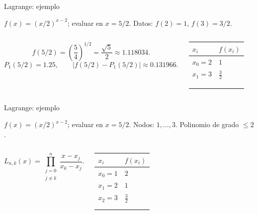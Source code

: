 \documentclass[main.tex]{subfiles}
\begin{document}
\begin{frame}[t]{Lagrange: ejemplo}
\par\noindent\begin{minipage}[t][7.5mm][t]{\textwidth}\small\strut $f(x)=(x/2)^{x-2}$; evaluar en $x=5/2$. Datos: $f(2)=1$, $f(3)=3/2$.\end{minipage}\par\nointerlineskip
\begin{columns}[T]\small\setlength{\abovedisplayskip}{4pt}\setlength{\belowdisplayskip}{4pt}\[f(5/2)=\left(\frac54\right)^{1/2}=\frac{\sqrt5}{2}\approx1.118034.\]\[P_1(5/2)=1.25,\qquad |f(5/2)-P_1(5/2)|\approx0.131966.\]\begingroup\small\setlength{\tabcolsep}{3pt}\begin{center}\begin{tabular}{|C{.42\textwidth}|C{.42\textwidth}|}\hline
\rule[-2mm]{0pt}{6mm}$x_i$&$f(x_i)$\\\hline
\rule[-2.5mm]{0pt}{6mm}$x_0=2$&$1$\\\hline
\rule[-2.5mm]{0pt}{6mm}$x_1=3$&$\frac{3}{2}$\\\hline
\rule[-2.5mm]{0pt}{6mm}&\\\hline
\rule[-2.5mm]{0pt}{6mm}&\\\hline
\rule[-2.5mm]{0pt}{6mm}&\\\hline
\end{tabular}\end{center}\endgroup\par
\end{columns}
\end{frame}
\begin{frame}[t]{Lagrange: ejemplo}
\par\noindent\begin{minipage}[t][7.5mm][t]{\textwidth}\small\strut $f(x)=(x/2)^{x-2}$; evaluar en $x=5/2$. Nodos: $1,\ldots,3$. Polinomio de grado $\le 2$.\end{minipage}\par\nointerlineskip
\begin{columns}[T]\small\setlength{\abovedisplayskip}{4pt}\setlength{\belowdisplayskip}{4pt}\[L_{n,k}(x)=\prod_{\substack{j=0\\j\ne k}}^n\frac{x-x_j}{x_k-x_j}.\]\begingroup\small\setlength{\tabcolsep}{3pt}\begin{center}\begin{tabular}{|C{.42\textwidth}|C{.42\textwidth}|}\hline
\rule[-2mm]{0pt}{6mm}$x_i$&$f(x_i)$\\\hline
\rule[-2.5mm]{0pt}{6mm}$x_0=1$&$2$\\\hline
\rule[-2.5mm]{0pt}{6mm}$x_1=2$&$1$\\\hline
\rule[-2.5mm]{0pt}{6mm}$x_2=3$&$\frac{3}{2}$\\\hline
\rule[-2.5mm]{0pt}{6mm}&\\\hline
\rule[-2.5mm]{0pt}{6mm}&\\\hline
\end{tabular}\end{center}\endgroup\par
\end{columns}
\end{frame}
\end{document}
